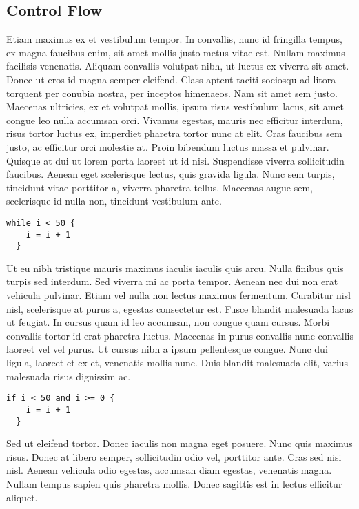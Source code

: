 \subsection{Control Flow}
Etiam maximus ex et vestibulum tempor. In convallis, nunc id fringilla tempus, ex magna faucibus enim, sit amet mollis justo metus vitae est. Nullam maximus facilisis venenatis. Aliquam convallis volutpat nibh, ut luctus ex viverra sit amet. Donec ut eros id magna semper eleifend. Class aptent taciti sociosqu ad litora torquent per conubia nostra, per inceptos himenaeos. Nam sit amet sem justo. Maecenas ultricies, ex et volutpat mollis, ipsum risus vestibulum lacus, sit amet congue leo nulla accumsan orci. Vivamus egestas, mauris nec efficitur interdum, risus tortor luctus ex, imperdiet pharetra tortor nunc at elit. Cras faucibus sem justo, ac efficitur orci molestie at. Proin bibendum luctus massa et pulvinar. Quisque at dui ut lorem porta laoreet ut id nisi. Suspendisse viverra sollicitudin faucibus. Aenean eget scelerisque lectus, quis gravida ligula. Nunc sem turpis, tincidunt vitae porttitor a, viverra pharetra tellus. Maecenas augue sem, scelerisque id nulla non, tincidunt vestibulum ante.
\begin{lstlisting}[language=Lucy]
  while i < 50 {
    i = i + 1
  }
\end{lstlisting}

Ut eu nibh tristique mauris maximus iaculis iaculis quis arcu. Nulla finibus quis turpis sed interdum. Sed viverra mi ac porta tempor. Aenean nec dui non erat vehicula pulvinar. Etiam vel nulla non lectus maximus fermentum. Curabitur nisl nisl, scelerisque at purus a, egestas consectetur est. Fusce blandit malesuada lacus ut feugiat. In cursus quam id leo accumsan, non congue quam cursus. Morbi convallis tortor id erat pharetra luctus. Maecenas in purus convallis nunc convallis laoreet vel vel purus. Ut cursus nibh a ipsum pellentesque congue. Nunc dui ligula, laoreet et ex et, venenatis mollis nunc. Duis blandit malesuada elit, varius malesuada risus dignissim ac.
\begin{lstlisting}[language=Lucy]
  if i < 50 and i >= 0 {
    i = i + 1
  }
\end{lstlisting}
Sed ut eleifend tortor. Donec iaculis non magna eget posuere. Nunc quis maximus risus. Donec at libero semper, sollicitudin odio vel, porttitor ante. Cras sed nisi nisl. Aenean vehicula odio egestas, accumsan diam egestas, venenatis magna. Nullam tempus sapien quis pharetra mollis. Donec sagittis est in lectus efficitur aliquet.

